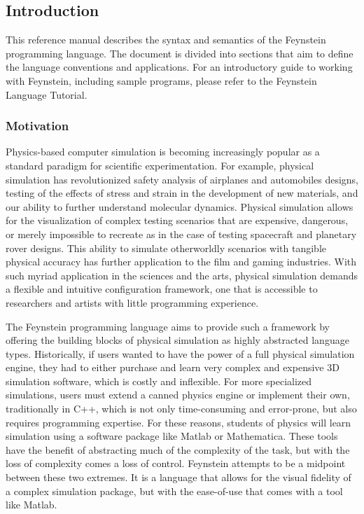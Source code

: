 \subsection{Introduction}
This reference manual describes the syntax and semantics of the
Feynstein programming language. The document is divided into
sections that aim to define the language conventions and
applications. For an introductory guide to working with Feynstein,
including sample programs, please refer to the Feynstein Language
Tutorial.

\subsubsection{Motivation}

Physics-based computer simulation is becoming increasingly popular as
a standard paradigm for scientific experimentation. For example,
physical simulation has revolutionized safety analysis of airplanes
and automobiles designs, testing of the effects of stress and strain
in the development of new materials, and our ability to further
understand molecular dynamics. Physical simulation allows for the
visualization of complex testing scenarios that are expensive,
dangerous, or merely impossible to recreate as in the case of testing
spacecraft and planetary rover designs. This ability to simulate
otherworldly scenarios with tangible physical accuracy has further
application to the film and gaming industries. With such myriad
application in the sciences and the arts, physical simulation demands
a flexible and intuitive configuration framework, one that is
accessible to researchers and artists with little programming
experience. 

The Feynstein programming language aims to provide such a framework by
offering the building blocks of physical simulation as highly
abstracted language types. Historically, if users wanted to have the
power of a full physical simulation engine, they had to either
purchase and learn very complex and expensive 3D simulation software,
which is costly and inflexible. For more specialized simulations,
users must extend a canned physics engine or implement their own,
traditionally in C++, which is not only time-consuming and
error-prone, but also requires programming expertise. For these
reasons, students of physics will learn simulation using a software
package like Matlab or Mathematica. These tools have the benefit of
abstracting much of the complexity of the task, but with the loss of
complexity comes a loss of control. Feynstein attempts to be a
midpoint between these two extremes. It is a language that allows for
the visual fidelity of a complex simulation package, but with the
ease-of-use that comes with a tool like Matlab.

